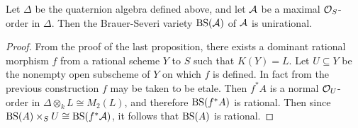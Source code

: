 \begin{prop}
Let $\Delta$ be the quaternion algebra defined above, and let $\mathcal{A}$ be a maximal $\mathcal{O}_S$-order in $\Delta$.  Then the Brauer-Severi variety $\textnormal{BS}(\mathcal{A})$ of $\mathcal{A}$ is unirational.
\end{prop}
\begin{proof}
From the proof of the last proposition, there exists a dominant rational morphism $f$ from a rational scheme $Y$ to $S$ such that $K(Y) = L$.  Let $U\subseteq Y$ be the nonempty open subscheme of $Y$ on which $f$ is defined.  In fact from the previous construction $f$ may be taken to be etale.  Then $f^*A$ is a normal $\mathcal{O}_U$-order in $\Delta\otimes_kL\cong M_2(L)$, and therefore $\textnormal{BS}(f^*A)$ is rational.  Then since $\textnormal{BS}(A)\times_S U\cong \textnormal{BS}(f^*\mathcal{A})$, it follows that $\textnormal{BS}(A)$ is rational.
\end{proof}
